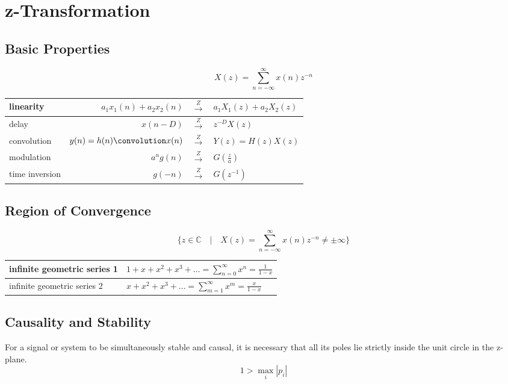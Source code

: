 \section{z-Transformation}

\subsection{Basic Properties}

\[
	X(z) = \sum\limits_{n=-\infty}^\infty x(n)z^{-n}
\]

\begin{tabularx}{0.6\textwidth}{|l|r>{\centering}Xl|}
	\hline
	linearity & $a_1x_1(n) + a_2x_2(n)$ & $\overset{Z}{\longrightarrow}$ & $a_1X_1(z) + a_2X_2(z)$
	\\ \hline
	delay	& $x(n-D)$ & $\overset{Z}{\longrightarrow}$ & $z^{-D}X(z)$
	\\ \hline
	convolution & $y(n) = h(n) \convolution x(n)$ & $\overset{Z}{\longrightarrow}$ & $Y(z) = H(z)X(z)$
	\\ \hline
	modulation & $a^n g(n)$ & $\overset{Z}{\longrightarrow}$ & $G(\frac{z}{a})$
	\\ \hline
	time inversion & $g(-n)$ & $\overset{Z}{\longrightarrow}$ & $G(z^{-1})$
	\\ \hline
\end{tabularx}


\subsection{Region of Convergence}

\[
	\{ z \in \mathbb{C} \quad | \quad X(z) = \sum\limits_{n=-\infty}^{\infty} x(n)z^{-n} \neq \pm \infty \}
\]

\label{geometricseries}
\begin{tabularx}{0.6\textwidth}{|l|X|}
	\hline
	infinite geometric series 1 & $1 + x + x^2 + x^3 + \ldots = \sum\limits_{n=0}^{\infty} x^n = \frac{1}{1-x}$
	\\ \hline
	infinite geometric series 2 & $x + x^2 + x^3 + \ldots = \sum\limits_{m=1}^{\infty} x^m = \frac{x}{1-x}$
	\\ \hline
\end{tabularx}


\subsection{Causality and Stability}

For a signal or system to be simultaneously stable and causal, it is necessary that all its poles lie strictly inside the unit circle in the z-plane. 
\[ 1 > \max\limits_{i}|p_i| \]

